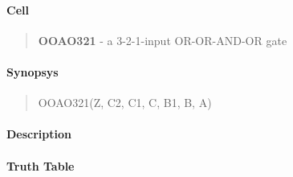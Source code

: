 \label{OOAO321}
\paragraph{Cell}
\begin{quote}
    \textbf{OOAO321} - a 3-2-1-input OR-OR-AND-OR gate
\end{quote}

\paragraph{Synopsys}
\begin{quote}
    OOAO321(Z, C2, C1, C, B1, B, A)
\end{quote}

\paragraph{Description}

%

\paragraph{Truth Table}
%

